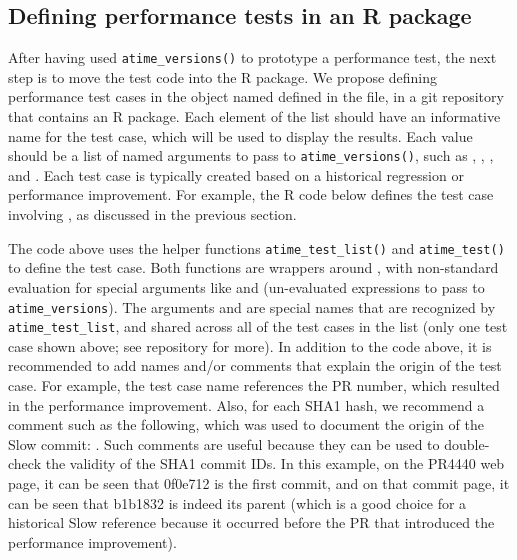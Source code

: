 \subsection{Defining performance tests in an R package}
After having used \verb|atime_versions()| to prototype a performance test, the next step is to move the test code into the R package. 
We propose defining performance test cases in the object named  defined in the  file, in a git repository  that contains an R package.
Each element of the list should have an informative name for the test case, which will be used to display the results.
Each value should be a list of named arguments to pass to \verb|atime_versions()|, such as , , , and  .
Each test case is typically created based on a historical regression or performance improvement. 
For example, the R code below defines the test case involving , as discussed in the previous section.
\begin{Schunk}
\end{Schunk}
The code above uses the helper functions \verb|atime_test_list()| and \verb|atime_test()| to define the test case.
Both functions are wrappers around , with non-standard evaluation for special arguments like  and  (un-evaluated expressions to pass to \verb|atime_versions|). 
The arguments  and  are special names that are recognized by \verb|atime_test_list|, and shared across all of the test cases in the list (only one test case shown above; see  repository for more).
In addition to the code above, it is recommended to add names and/or comments that explain the origin of the test case.
For example, the test case name  references the PR number, which resulted in the performance improvement.
Also, for each SHA1 hash, we recommend a comment such as the following, which was used to document the origin of the Slow commit:
.
Such comments are useful because they can be used to double-check the validity of the SHA1 commit IDs.
In this example, on the PR4440 web page, it can be seen that 0f0e712 is the first commit, and on that commit page, it can be seen that b1b1832 is indeed its parent (which is a good choice for a historical Slow reference because it occurred before the PR that introduced the performance improvement).

